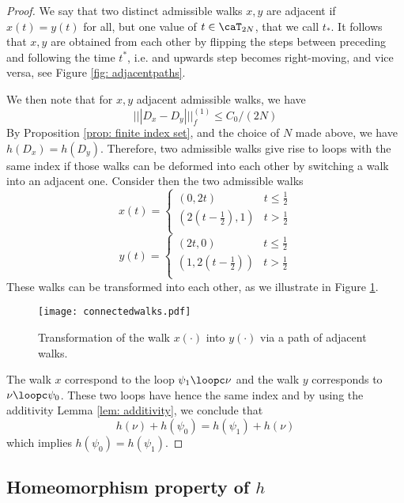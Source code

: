 \begin{proof}
	We say that two distinct admissible walks $x,y$ are adjacent if $x(t)=y(t)$ for all, but one value of $t\in\caT_{2N}$, that we call $t_*$.  It follows that $x,y$ are obtained from each other by flipping the steps between preceding and following the time $t^*$, i.e. and upwards step becomes right-moving, and vice versa, see Figure \ref{fig: adjacentpaths}.  
	
	We then note that for $x,y$ adjacent admissible walks, we have
	$$
	||| D_x-D_y |||^{(1)}_f \leq C_0/(2N)
	$$
	By Proposition \ref{prop: finite index set}, and the choice of $N$ made above, we have $h(D_x)=h(D_y)$.  Therefore, two admissible walks give rise to loops with the same index if those walks can be deformed into each other by switching a walk into an adjacent one. 
	Consider then the two admissible walks
	$$
	x(t)=\begin{cases} (0,2t) &  t \leq \tfrac{1}{2} \\
		(2(t- \tfrac{1}{2}),1) &  t  > \tfrac{1}{2} \\
	\end{cases}
	$$
	$$
	y(t)=\begin{cases} (2t,0) &  t \leq \tfrac{1}{2} \\
		(1, 2(t- \tfrac{1}{2}) ) &    t  > \tfrac{1}{2}  \\
	\end{cases}
	$$
	These walks can be transformed into each other, as we illustrate in Figure \ref{fig: connected walks}.
	\begin{figure}[htb!]
		\begin{center}
			\texttt{[image: connectedwalks.pdf]}
			\caption{Transformation of the walk $x(\cdot)$ into $y(\cdot)$ via a path of adjacent walks. 
			}
			\label{fig: connected walks}
		\end{center}
	\end{figure} 
	The walk $x$ correspond to the loop $\psi_1\loopc\nu$ and the walk $y$ corresponds to $\nu\loopc\psi_0$. These two loops have hence the same index and by using the additivity Lemma \ref{lem: additivity}, we conclude that
	$$
	h(\nu)+h(\psi_0)= h(\psi_1)+h(\nu)
	$$
	which implies  $h(\psi_0)= h(\psi_1)$. 
\end{proof}


\subsection{Homeomorphism property of $h$}\label{sec: group homomorfism}

